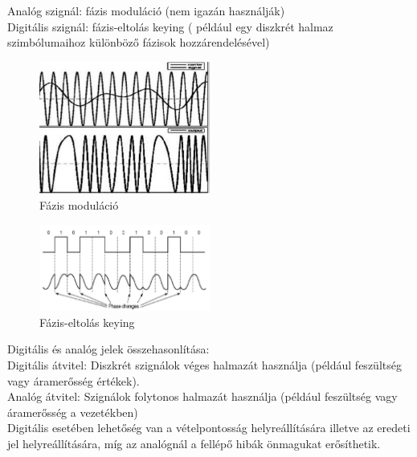 \documentclass[margin=0px]{article}
\begin{document}
\begin{description}
\begin{itemize}
\begin{itemize}
                            Analóg szignál: fázis moduláció (nem igazán használják)\\
                            Digitális szignál: fázis-eltolás keying ( például egy diszkrét halmaz szimbólumaihoz különböző fázisok hozzárendelésével)
                            \begin{figure}[H]
                                \centering
                                \includegraphics[width=0.5\textwidth]{img/fazis_mod.png}
                                \caption{Fázis moduláció}
                            \end{figure}
                            \begin{figure}[H]
                                \centering
                                \includegraphics[width=0.5\textwidth]{img/fazis_key.png}
                                \caption{Fázis-eltolás keying}
                            \end{figure}
                  \end{itemize}

                  Digitális és analóg jelek összehasonlítása: \\
                  Digitális átvitel: Diszkrét szignálok véges halmazát
                  használja (például feszültség vagy áramerősség
                  értékek).\\
                  Analóg átvitel: Szignálok folytonos halmazát használja
                  (például feszültség vagy áramerősség a vezetékben) \\
                  Digitális esetében lehetőség van a vételpontosság helyreállítására illetve az eredeti jel helyreállítására, míg az analógnál a fellépő hibák önmagukat erősíthetik.
        \end{itemize}
\end{description}
\end{document}
